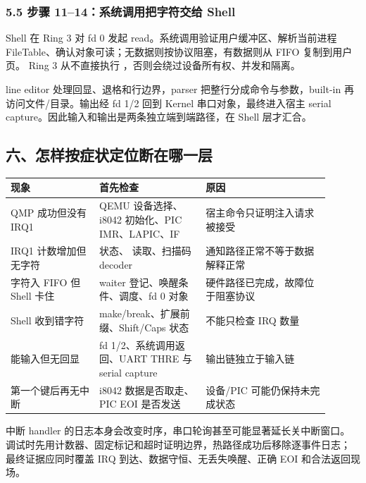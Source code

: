 \subsubsection{5.5 步骤 11--14：系统调用把字符交给 Shell}

Shell 在 Ring 3 对 fd 0 发起 read。系统调用验证用户缓冲区、解析当前进程
FileTable、确认对象可读；无数据则按协议阻塞，有数据则从 FIFO 复制到用户页。
Ring 3 从不直接执行 ，否则会绕过设备所有权、并发和隔离。

line editor 处理回显、退格和行边界，parser 把整行分成命令与参数，built-in
再访问文件/目录。输出经 fd 1/2 回到 Kernel 串口对象，最终进入宿主 serial
capture。因此输入和输出是两条独立端到端路径，在 Shell 层才汇合。

\subsection{六、怎样按症状定位断在哪一层}

\begin{longtable}{L{0.25\linewidth}L{0.30\linewidth}L{0.35\linewidth}}
\toprule
现象 & 首先检查 & 原因 \\
\midrule
QMP 成功但没有 IRQ1 & QEMU 设备选择、i8042 初始化、PIC IMR、LAPIC、IF & 宿主命令只证明注入请求被接受 \\
IRQ1 计数增加但无字符 &  状态、 读取、扫描码 decoder & 通知路径正常不等于数据解释正常 \\
字符入 FIFO 但 Shell 卡住 & waiter 登记、唤醒条件、调度、fd 0 对象 & 硬件路径已完成，故障位于阻塞协议 \\
Shell 收到错字符 & make/break、扩展前缀、Shift/Caps 状态 & 不能只检查 IRQ 数量 \\
能输入但无回显 & fd 1/2、系统调用返回、UART THRE 与 serial capture & 输出链独立于输入链 \\
第一个键后再无中断 & i8042 数据是否取走、PIC EOI 是否发送 & 设备/PIC 可能仍保持未完成状态 \\
\bottomrule
\end{longtable}

\begin{failurebox}
中断 handler 的日志本身会改变时序，串口轮询甚至可能显著延长关中断窗口。
调试时先用计数器、固定标记和超时证明边界，热路径成功后移除逐事件日志；
最终证据应同时覆盖 IRQ 到达、数据守恒、无丢失唤醒、正确 EOI 和合法返回现场。
\end{failurebox}
